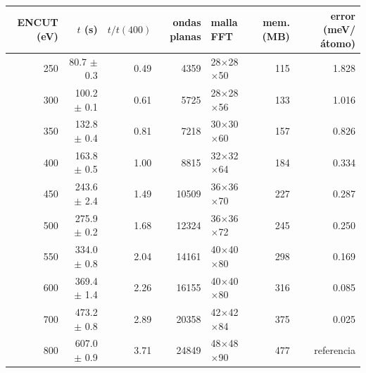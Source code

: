 \begin{tabular}{r r r r l r r}
\toprule
ENCUT (eV) & $t$ (s) & $t/t(400)$ & ondas planas & malla FFT & mem. (MB) & error (meV/átomo) \\
\midrule
250 & 80.7 $\pm$ 0.3 & 0.49 & 4359 & 28$\times$28$\times$50 & 115 & 1.828 \\
300 & 100.2 $\pm$ 0.1 & 0.61 & 5725 & 28$\times$28$\times$56 & 133 & 1.016 \\
350 & 132.8 $\pm$ 0.4 & 0.81 & 7218 & 30$\times$30$\times$60 & 157 & 0.826 \\
400 & 163.8 $\pm$ 0.5 & 1.00 & 8815 & 32$\times$32$\times$64 & 184 & 0.334 \\
450 & 243.6 $\pm$ 2.4 & 1.49 & 10509 & 36$\times$36$\times$70 & 227 & 0.287 \\
500 & 275.9 $\pm$ 0.2 & 1.68 & 12324 & 36$\times$36$\times$72 & 245 & 0.250 \\
550 & 334.0 $\pm$ 0.8 & 2.04 & 14161 & 40$\times$40$\times$80 & 298 & 0.169 \\
600 & 369.4 $\pm$ 1.4 & 2.26 & 16155 & 40$\times$40$\times$80 & 316 & 0.085 \\
700 & 473.2 $\pm$ 0.8 & 2.89 & 20358 & 42$\times$42$\times$84 & 375 & 0.025 \\
800 & 607.0 $\pm$ 0.9 & 3.71 & 24849 & 48$\times$48$\times$90 & 477 & referencia \\
\bottomrule
\end{tabular}
